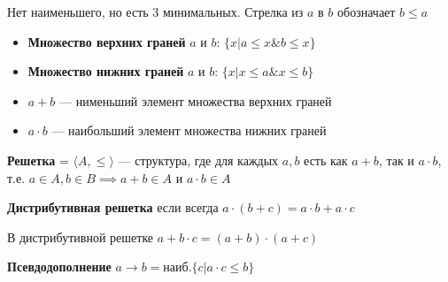 \documentclass[oneside]{book}
\begin{document}
\begin{examp}
	\-
	\begin{center}
	\end{center}
	Нет наименьшего, но есть 3 минимальных. Стрелка из \(a\) в \(b\) обозначает \(b \le a\)
\end{examp}
\begin{definition}
	\-
	\begin{itemize}
		\item \textbf{Множество верхних граней} \(a\) и \(b\): \(\{x \big| a \le x \& b \le x\}\)
		\item \textbf{Множество нижних граней} \(a\) и \(b\): \(\{x \big| x \le a \& x \le b\}\)
	\end{itemize}
	\label{orgc56a0e1}
\end{definition}
\begin{definition}
	\-
	\begin{itemize}
		\item \textbf{\(a + b\)} --- нименьший элемент множества верхних граней
		\item \textbf{\(a \cdot b\)} --- наибольший элемент множества нижних граней
	\end{itemize}
	\label{org40e884c}
\end{definition}
\begin{definition}
	\textbf{Решетка} = \(\langle A, \le \rangle\) --- структура, где для каждых \(a, b\) есть как \(a + b\), так и \(a \cdot b\), \\
	т.е. \(a \in A, b \in B \implies a + b \in A\) и \(a \cdot b \in A\)
	\label{org264da3b}
\end{definition}
\begin{definition}
	\textbf{Дистрибутивная решетка} если всегда  \(a \cdot (b + c) = a \cdot b + a \cdot c\)
	\label{org60c8061}
\end{definition}
\begin{lemma}
	В дистрибутивной решетке \(a + b\cdot c = (a + b) \cdot(a + c)\)
	\label{org949c537}
\end{lemma}
\begin{definition}
	\textbf{Псевдодополнение} \(a \to b = \text{наиб.}\{c \big| a \cdot c \le b\}\)
	\label{org766a20d}
\end{definition}
\end{document}
